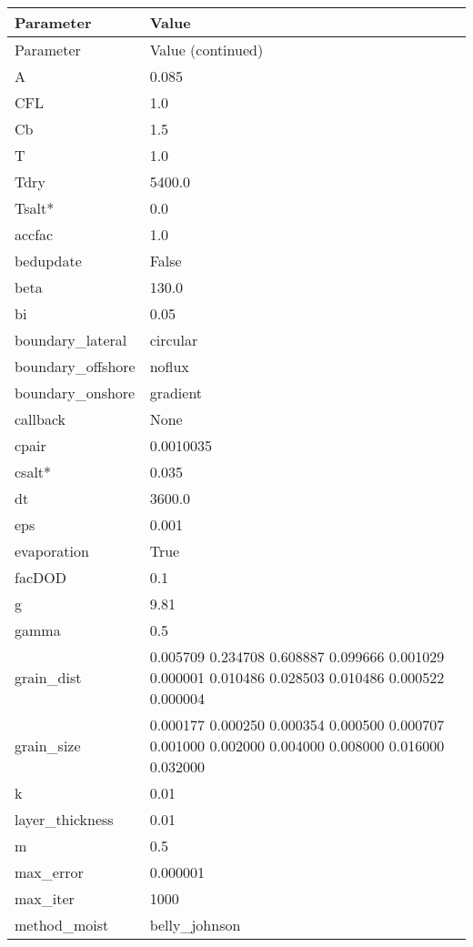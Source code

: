 \begin{longtable}{p{3cm} p{8cm}}
  Parameter         & Value \\
  \hline
  \endfirsthead
  Parameter         & Value \hfill (continued)\\
  \hline
  \endhead
  A                 & 0.085 \\
  CFL               & 1.0 \\
  Cb                & 1.5 \\
  T                 & 1.0 \\
  Tdry              & 5400.0 \\
  Tsalt*            & 0.0 \\
  accfac            & 1.0 \\
  bedupdate         & False \\
  beta              & 130.0 \\
  bi                & 0.05 \\
  boundary\_lateral  & circular \\
  boundary\_offshore & noflux \\
  boundary\_onshore  & gradient \\
  callback          & None \\
  cpair             & 0.0010035 \\
  csalt*            & 0.035 \\
  dt                & 3600.0 \\
  eps               & 0.001 \\
  evaporation       & True \\
  facDOD            & 0.1 \\
  g                 & 9.81 \\
  gamma             & 0.5 \\
  grain\_dist       & 0.005709 0.234708 0.608887 0.099666 0.001029 0.000001 0.010486 0.028503 0.010486 0.000522 0.000004 \\
  grain\_size       & 0.000177 0.000250 0.000354 0.000500 0.000707 0.001000 0.002000 0.004000 0.008000 0.016000 0.032000 \\
  k                 & 0.01 \\
  layer\_thickness  & 0.01 \\
  m                 & 0.5 \\
  max\_error         & 0.000001 \\
  max\_iter          & 1000 \\
  method\_moist      & belly\_johnson \\

\end{longtable}
